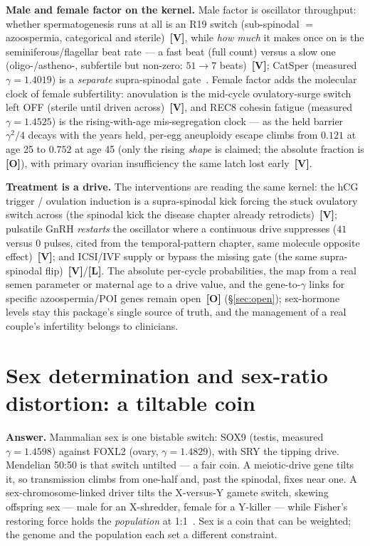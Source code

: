 \documentclass[11pt]{article}
\newcommand{\gradeV}{\textcolor{verified}{\textbf{[V]}}}
\newcommand{\gradeL}{\textcolor{verified}{\textbf{[L]}}}
\newcommand{\gradeO}{\textcolor{open}{\textbf{[O]}}}
\begin{document}
\textbf{Male and female factor on the kernel.} Male factor is oscillator throughput: whether
spermatogenesis runs at all is an R19 switch (sub-spinodal $=$ azoospermia, categorical and
sterile)~\gradeV{}, while \emph{how much} it makes once on is the seminiferous/flagellar beat rate ---
a fast beat (full count) versus a slow one (oligo-/astheno-, subfertile but non-zero:
$51 \to 7$ beats)~\gradeV{}; CatSper
(measured $\gamma = 1.4019$) is a \emph{separate} supra-spinodal
gate~\cite{santalucia}. Female factor adds the molecular clock of female subfertility: anovulation is the
mid-cycle ovulatory-surge switch left OFF (sterile until driven across)~\gradeV{}, and REC8 cohesin fatigue
(measured $\gamma = 1.4525$) is the rising-with-age mis-segregation clock ---
as the held barrier $\gamma^{2}/4$ decays with the years held, per-egg aneuploidy escape climbs from
$0.121$ at age 25 to $0.752$ at age
45 (only the rising \emph{shape} is claimed; the absolute fraction is \gradeO{}),
with primary ovarian insufficiency the same latch lost early~\gradeV{}.

\textbf{Treatment is a drive.} The interventions are reading the same kernel: the hCG trigger / ovulation
induction is a supra-spinodal kick forcing the stuck ovulatory switch across (the spinodal kick the disease
chapter already retrodicts)~\gradeV{}; pulsatile GnRH \emph{restarts} the oscillator where a continuous drive
suppresses ($41$ versus $0$
pulses, cited from the temporal-pattern chapter, same molecule opposite effect)~\gradeV{}; and ICSI/IVF supply
or bypass the missing gate (the same supra-spinodal flip)~\gradeV{}/\gradeL{}. The absolute per-cycle
probabilities, the map from a real semen parameter or maternal age to a drive value, and the gene-to-$\gamma$
links for specific azoospermia/POI genes remain open~\gradeO{} (\S\ref{sec:open}); sex-hormone levels stay
this package's single source of truth, and the management of a real couple's infertility belongs to clinicians.

\section{Sex determination and sex-ratio distortion: a tiltable coin}

\textbf{Answer.} Mammalian sex is one bistable switch: SOX9 (testis, measured
$\gamma = 1.4598$) against FOXL2 (ovary, $\gamma = 1.4829$),
with SRY the tipping drive. Mendelian 50:50 is that switch untilted --- a fair coin. A meiotic-drive gene
tilts it, so transmission climbs from one-half and, past the spinodal, fixes near one. A sex-chromosome-linked
driver tilts the X-versus-Y gamete switch, skewing offspring sex --- male for an X-shredder, female for a
Y-killer --- while Fisher's restoring force holds the \emph{population} at 1:1~\cite{fisher}. Sex is a coin
that can be weighted; the genome and the population each set a different constraint.
\end{document}
